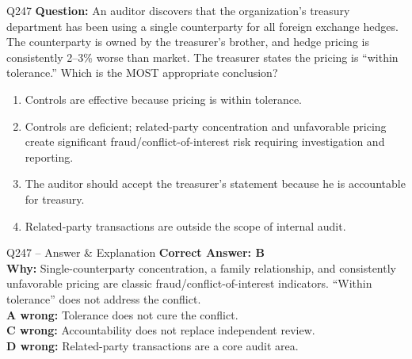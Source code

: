 \documentclass[aspectratio=169,10pt]{beamer}
\begin{document}
	\begin{frame}[t]{Q247}
		\small
		\textbf{Question:} An auditor discovers that the organization's treasury department has been using a single counterparty for all foreign exchange hedges. The counterparty is owned by the treasurer's brother, and hedge pricing is consistently 2--3\% worse than market. The treasurer states the pricing is ``within tolerance.'' Which is the MOST appropriate conclusion?
		\begin{enumerate}[label=\Alph*.,itemsep=1pt,topsep=2pt]
			\item Controls are effective because pricing is within tolerance.
			\item Controls are deficient; related-party concentration and unfavorable pricing create significant fraud/conflict-of-interest risk requiring investigation and reporting.
			\item The auditor should accept the treasurer's statement because he is accountable for treasury.
			\item Related-party transactions are outside the scope of internal audit.
		\end{enumerate}
	\end{frame}
	
	\begin{frame}[t]{Q247 -- Answer \& Explanation}
		\small
		\textbf{Correct Answer: B} \\[4pt]
		\textbf{Why:} Single-counterparty concentration, a family relationship, and consistently unfavorable pricing are classic fraud/conflict-of-interest indicators. ``Within tolerance'' does not address the conflict. \\[4pt]
		\textbf{A wrong:} Tolerance does not cure the conflict. \\[2pt]
		\textbf{C wrong:} Accountability does not replace independent review. \\[2pt]
		\textbf{D wrong:} Related-party transactions are a core audit area.
	\end{frame}
	
\end{document}
